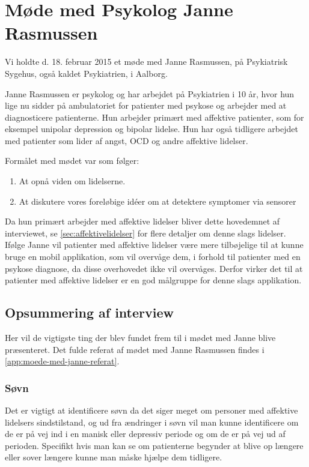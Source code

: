 \section{Møde med Psykolog Janne Rasmussen}\label{sec:moede-med-psykolog}
Vi holdte d. 18. februar 2015 et møde med Janne Rasmussen, på Psykiatrisk Sygehus, også kaldet Psykiatrien, i Aalborg.

Janne Rasmussen er psykolog og har arbejdet på Psykiatrien i 10 år, hvor hun lige nu sidder på ambulatoriet for patienter med psykose og arbejder med at diagnosticere patienterne. 
Hun arbejder primært med affektive patienter, som for eksempel unipolar depression og bipolar lidelse.
Hun har også tidligere arbejdet med patienter som lider af angst, OCD og andre affektive lidelser.

Formålet med mødet var som følger:

\begin{enumerate}
\item At opnå viden om lidelserne.
\item At diskutere vores foreløbige idéer om at detektere symptomer via sensorer
\end{enumerate}

Da hun primært arbejder med affektive lidelser bliver dette hovedemnet af interviewet, se \cref{sec:affektivelidelser} for flere detaljer om denne slags lidelser.
Ifølge Janne vil patienter med affektive lidelser være mere tilbøjelige til at kunne bruge en mobil applikation, som vil overvåge dem, i forhold til patienter med en psykose diagnose, da disse overhovedet ikke vil overvåges.
Derfor virker det til at patienter med affektive lidelser er en god målgruppe for denne slags applikation.

\subsection{Opsummering af interview}
Her vil de vigtigste ting der blev fundet frem til i mødet med Janne blive præsenteret.
Det fulde referat af mødet med Janne Rasmussen findes i \cref{app:moede-med-janne-referat}.

\subsubsection{Søvn}
Det er vigtigt at identificere søvn da det siger meget om personer med affektive lidelsers sindstilstand, og ud fra ændringer i søvn vil man kunne identificere om de er på vej ind i en manisk eller depressiv periode og om de er på vej ud af perioden. 
Specifikt hvis man kan se om patienterne begynder at blive op længere eller sover længere kunne man måske hjælpe dem tidligere.

